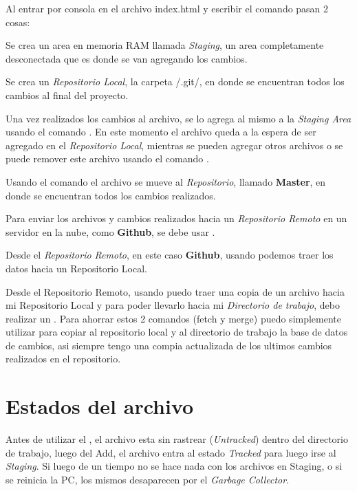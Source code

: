 \documentclass[]{article} %
\begin{document}
Al entrar por consola en el archivo index.html y escribir el comando  pasan 2 cosas:

Se crea un area en memoria RAM llamada \textit{Staging}, un area completamente desconectada que es donde se van agregando los cambios.

Se crea un \textit{Repositorio Local}, la carpeta /.git/, en donde se encuentran todos los cambios al final del proyecto.

Una vez realizados los cambios al archivo, se lo agrega al mismo a la \textit{Staging Area} usando el comando . En este momento el archivo queda a la espera de ser agregado en el \textit{Repositorio Local}, mientras se pueden agregar otros archivos o se puede remover este archivo usando el comando .

Usando el comando  el archivo se mueve al \textit{Repositorio}, llamado \textbf{Master}, en donde se encuentran todos los cambios realizados.

Para enviar los archivos y cambios realizados hacia un \textit{Repositorio Remoto} en un servidor en la nube, como \textbf{Github}, se debe usar .

Desde el \textit{Repositorio Remoto}, en este caso \textbf{Github}, usando  podemos traer los datos hacia un Repositorio Local.

Desde el Repositorio Remoto, usando  puedo traer una copia de un archivo hacia mi Repositorio Local y para poder llevarlo hacia mi \textit{Directorio de trabajo}, debo realizar un 
. Para ahorrar estos 2 comandos (fetch y merge) puedo simplemente utilizar  para copiar al repositorio local y al directorio de trabajo la base de datos de cambios, asi siempre tengo una compia actualizada de los ultimos cambios realizados en el repositorio.

\section*{Estados del archivo}
Antes de utilizar el , el archivo esta sin rastrear (\textit{Untracked}) dentro del directorio de trabajo, luego del Add, el archivo entra al estado \textit{Tracked} para luego irse al \textit{Staging}. Si luego de un tiempo no se hace nada con los archivos en Staging, o si se reinicia la PC, los mismos desaparecen por el \textit{Garbage Collector}.
\end{document}
